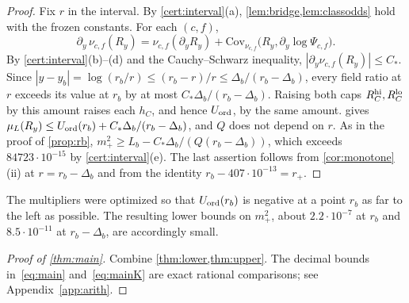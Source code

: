 \begin{proof}
Fix $r$ in the interval. By \cref{cert:interval}(a), \cref{lem:bridge,lem:classodds} hold with the frozen constants. For each $(c,f)$,
\[
 \partial_y\,\nu_{c,f}(R_y)=\nu_{c,f}(\partial_yR_y)+\mathrm{Cov}_{\nu_{c,f}}\bigl(R_y,\partial_y\log\Psi_{c,f}\bigr).
\]
By \cref{cert:interval}(b)--(d) and the Cauchy--Schwarz inequality, $|\partial_y\nu_{c,f}(R_y)|\le C_*$. Since $|y-y_b|=\log(r_b/r)\le(r_b-r)/r\le \Delta_b/(r_b-\Delta_b)$, every field ratio at $r$ exceeds its value at $r_b$ by at most $C_*\Delta_b/(r_b-\Delta_b)$. Raising both caps $R^{\rm hi}_C,R^{\rm lo}_C$ by this amount raises each $h_C$, and hence $U_{\mathrm{ord}}$, by the same amount.  gives $\mu_L(R_y)\le U_{\mathrm{ord}}(r_b)+C_*\Delta_b/(r_b-\Delta_b)$, and $Q$ does not depend on $r$. As in the proof of \cref{prop:rb}, $m_+^2\ge L_b-C_*\Delta_b/(Q(r_b-\Delta_b))$, which exceeds $84723\cdot10^{-15}$ by \cref{cert:interval}(e). The last assertion follows from \cref{cor:monotone}(ii) at $r=r_b-\Delta_b$ and from the identity $r_b-407\cdot10^{-13}=r_+$.
\end{proof}

\begin{remark}
The multipliers were optimized so that $U_{\mathrm{ord}}(r_b)$ is negative at a point $r_b$ as far to the left as possible. The resulting lower bounds on $m_+^2$, about $2.2\cdot10^{-7}$ at $r_b$ and $8.5\cdot10^{-11}$ at $r_b-\Delta_b$, are accordingly small.
\end{remark}

\begin{proof}[Proof of \cref{thm:main}]
Combine \cref{thm:lower,thm:upper}. The decimal bounds in~\eqref{eq:main} and~\eqref{eq:mainK} are exact rational comparisons; see Appendix~\ref{app:arith}.
\end{proof}
